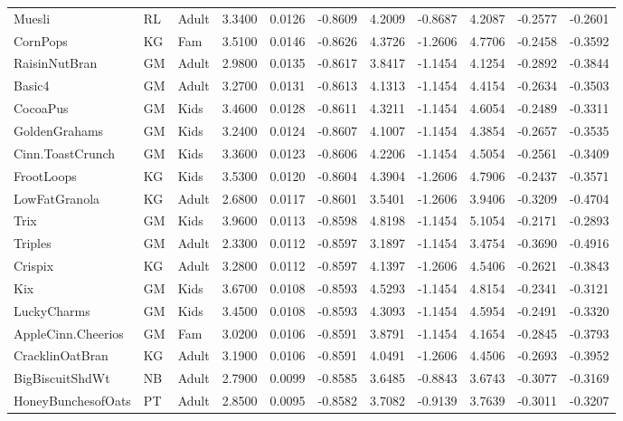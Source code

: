 \begin{table}[!htbp]
\begin{tabular}{lllllllllll}
\\
Muesli & RL & Adult & 3.3400 & 0.0126 & -0.8609 & 4.2009 & -0.8687 & 4.2087 & -0.2577 & -0.2601
\\
CornPops & KG & Fam & 3.5100 & 0.0146 & -0.8626 & 4.3726 & -1.2606 & 4.7706 & -0.2458 & -0.3592
\\
RaisinNutBran & GM & Adult & 2.9800 & 0.0135 & -0.8617 & 3.8417 & -1.1454 & 4.1254 & -0.2892 & -0.3844
\\
Basic4 & GM & Adult & 3.2700 & 0.0131 & -0.8613 & 4.1313 & -1.1454 & 4.4154 & -0.2634 & -0.3503
\\
CocoaPus & GM & Kids & 3.4600 & 0.0128 & -0.8611 & 4.3211 & -1.1454 & 4.6054 & -0.2489 & -0.3311
\\
GoldenGrahams & GM & Kids & 3.2400 & 0.0124 & -0.8607 & 4.1007 & -1.1454 & 4.3854 & -0.2657 & -0.3535
\\
Cinn.ToastCrunch & GM & Kids & 3.3600 & 0.0123 & -0.8606 & 4.2206 & -1.1454 & 4.5054 & -0.2561 & -0.3409
\\
FrootLoops & KG & Kids & 3.5300 & 0.0120 & -0.8604 & 4.3904 & -1.2606 & 4.7906 & -0.2437 & -0.3571
\\
LowFatGranola & KG & Adult & 2.6800 & 0.0117 & -0.8601 & 3.5401 & -1.2606 & 3.9406 & -0.3209 & -0.4704
\\
Trix & GM & Kids & 3.9600 & 0.0113 & -0.8598 & 4.8198 & -1.1454 & 5.1054 & -0.2171 & -0.2893
\\
Triples & GM & Adult & 2.3300 & 0.0112 & -0.8597 & 3.1897 & -1.1454 & 3.4754 & -0.3690 & -0.4916
\\
Crispix & KG & Adult & 3.2800 & 0.0112 & -0.8597 & 4.1397 & -1.2606 & 4.5406 & -0.2621 & -0.3843
\\
Kix & GM & Kids & 3.6700 & 0.0108 & -0.8593 & 4.5293 & -1.1454 & 4.8154 & -0.2341 & -0.3121
\\
LuckyCharms & GM & Kids & 3.4500 & 0.0108 & -0.8593 & 4.3093 & -1.1454 & 4.5954 & -0.2491 & -0.3320
\\
AppleCinn.Cheerios & GM & Fam & 3.0200 & 0.0106 & -0.8591 & 3.8791 & -1.1454 & 4.1654 & -0.2845 & -0.3793
\\
CracklinOatBran & KG & Adult & 3.1900 & 0.0106 & -0.8591 & 4.0491 & -1.2606 & 4.4506 & -0.2693 & -0.3952
\\
BigBiscuitShdWt & NB & Adult & 2.7900 & 0.0099 & -0.8585 & 3.6485 & -0.8843 & 3.6743 & -0.3077 & -0.3169
\\
HoneyBunchesofOats & PT & Adult & 2.8500 & 0.0095 & -0.8582 & 3.7082 & -0.9139 & 3.7639 & -0.3011 & -0.3207
\\

\end{tabular}
\end{table}
